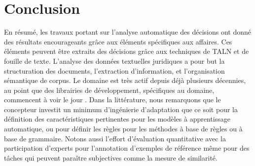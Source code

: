 \section{Conclusion}
\label{sec:literature:conclusion}
En résumé, les travaux portant sur l'analyse automatique des décisions ont donné des résultats encourageants grâce aux éléments spécifiques aux affaires. Ces éléments peuvent être extraits des décisions grâce aux techniques de TALN et de fouille de texte.  L'analyse des données textuelles juridiques a pour but la structuration des documents, l'extraction d'information, et l'organisation sémantique de corpus. Le domaine est très actif depuis déjà plusieurs décennies, au point que des librairies de développement, spécifiques au domaine, commencent à voir le jour \citep{bommarito2018lexnlp}. Dans la littérature, nous remarquons que le concepteur investit un minimum d'ingénierie d'adaptation que ce soit pour la définition des caractéristiques pertinentes pour les modèles à apprentissage automatique, ou pour définir les règles pour les méthodes à base de règles ou à base de grammaire. Notons aussi l'effort d'évaluation quantitative avec la participation d'experts pour l'annotation d'exemples de référence même pour des tâches qui peuvent paraître subjectives comme la mesure de similarité.



